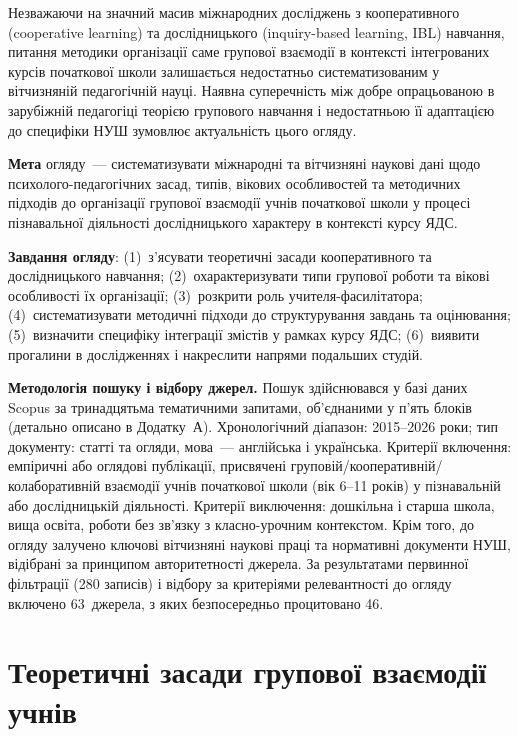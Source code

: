 \documentclass[a4paper,14pt]{extarticle}
\begin{document}
Незважаючи на значний масив міжнародних досліджень з кооперативного (cooperative learning) та дослідницького (inquiry-based learning, IBL) навчання, питання методики організації саме групової взаємодії в контексті інтегрованих курсів початкової школи залишається недостатньо систематизованим у вітчизняній педагогічній науці. Наявна суперечність між добре опрацьованою в зарубіжній педагогіці теорією групового навчання і недостатньою її адаптацією до специфіки НУШ зумовлює актуальність цього огляду.

\textbf{Мета} огляду~--- систематизувати міжнародні та вітчизняні наукові дані щодо психолого-педагогічних засад, типів, вікових особливостей та методичних підходів до організації групової взаємодії учнів початкової школи у процесі пізнавальної діяльності дослідницького характеру в контексті курсу ЯДС.

\textbf{Завдання огляду}: (1)~з'ясувати теоретичні засади кооперативного та дослідницького навчання; (2)~охарактеризувати типи групової роботи та вікові особливості їх організації; (3)~розкрити роль учителя-фасилітатора; (4)~систематизувати методичні підходи до структурування завдань та оцінювання; (5)~визначити специфіку інтеграції змістів у рамках курсу ЯДС; (6)~виявити прогалини в дослідженнях і накреслити напрями подальших студій.

\textbf{Методологія пошуку і відбору джерел.} Пошук здійснювався у базі даних Scopus за тринадцятьма тематичними запитами, об'єднаними у п'ять блоків (детально описано в Додатку~А). Хронологічний діапазон: 2015--2026 роки; тип документу: статті та огляди, мова~--- англійська і українська. Критерії включення: емпіричні або оглядові публікації, присвячені груповій/кооперативній/колаборативній взаємодії учнів початкової школи (вік 6--11 років) у пізнавальній або дослідницькій діяльності. Критерії виключення: дошкільна і старша школа, вища освіта, роботи без зв'язку з класно-урочним контекстом. Крім того, до огляду залучено ключові вітчизняні наукові праці та нормативні документи НУШ, відібрані за принципом авторитетності джерела. За результатами первинної фільтрації (280 записів) і відбору за критеріями релевантності до огляду включено 63~джерела, з яких безпосередньо процитовано 46.

\newpage

\section{Теоретичні засади групової взаємодії учнів}
\end{document}
